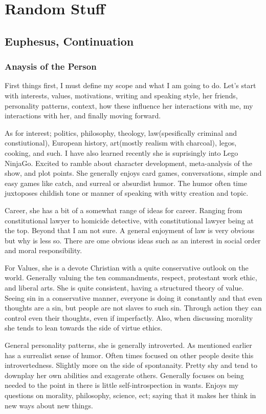 \chapter{Random Stuff}
\section{Euphesus, Continuation}

\subsection{Anaysis of the Person}

First things first, I must define my scope and what I am going to do. Let's start with interests, values, motivations, writing and speaking style, her friends, personality patterns, context, how these influence her interactions with me, my interactions with her, and finally moving forward.

As for interest; politics, philosophy, theology, law(spesifically criminal and constiutional), European history, art(mostly realism with charcoal), legos, cooking, and such. I have also learned recently she is suprisingly into Lego NinjaGo. Excited to ramble about character development, meta-analysis of the show, and plot points. She generally enjoys card games, conversations, simple and easy games like catch, and surreal or absurdist humor. The humor often time juxtoposes childish tone or manner of speaking with witty creation and topic.

Career, she has a bit of a somewhat range of ideas for career. Ranging from constitutional lawyer to homicide detective, with constitutional lawyer being at the top. Beyond that I am not sure. A general enjoyment of law is very obvious but why is less so. There are ome obvious ideas such as an interest in social order and moral responsibility.

For Values, she is a devote Christian with a quite conservative outlook on the world. Generally valuing the ten commandments, respect, protestant work ethic, and liberal arts. She is quite consistent, having a structured theory of value. Seeing sin in a conservative manner, everyone is doing it constantly and that even thoughts are a sin, but people are not slaves to such sin. Through action they can control even their thoughts, even if imperfactly. Also, when discussing morality she tends to lean towards the side of virtue ethics.

General personality patterns, she is generally introverted. As mentioned earlier has a surrealist sense of humor. Often times focused on other people desite this introvertedness. Slightly more on the side of spontanaity. Pretty shy and tend to downplay her own abilities and exagerate others. Generally focuses on being needed to the point in there is little self-introspection in wants. Enjoys my questions on morality, philosophy, science, ect; saying that it makes her think in new ways about new things.

